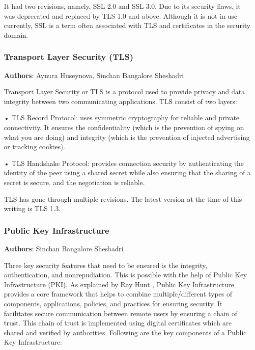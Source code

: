 It had two revisions, namely, SSL 2.0 and SSL 3.0. Due to its security flaws, it was deprecated and replaced by TLS 1.0 and above. Although it is not in use currently, SSL is a term often associated with TLS and certificates in the security domain.\footnotemark




\subsubsection{Transport Layer Security (TLS)}
\textbf{Authors}: Aynura Huseynova, Sinchan Bangalore Sheshadri

Transport Layer Security or TLS is a protocol used to provide privacy and data integrity between two communicating applications. TLS consist of two layers:

•	TLS Record Protocol: uses symmetric cryptography for reliable and private connectivity. It ensures the confidentiality (which is the prevention of spying on what you are doing) and integrity (which is the prevention of injected advertising or tracking cookies). 

•	TLS Handshake Protocol: provides connection security by authenticating the identity of the peer using a shared secret while also ensuring that the sharing of a secret is secure, and the negotiation is reliable.\footnotemark


TLS has gone through multiple revisions. The latest version at the time of this writing is TLS 1.3.


\subsubsection{Public Key Infrastructure}
\textbf{Authors}: Sinchan Bangalore Sheshadri

Three key security features that need to be ensured is the integrity, authentication, and nonrepudiation. This is possible with the help of Public Key Infrastructure (PKI). As explained by Ray Hunt \cite{962346}, Public Key Infrastructure provides a core framework that helps to combine multiple/different types of components, applications, policies, and practices for ensuring security. It facilitates secure communication between remote users by ensuring a chain of trust. This chain of trust is implemented using digital certificates which are shared and verified by authorities. Following are the key components of a Public Key Infrastructure:

